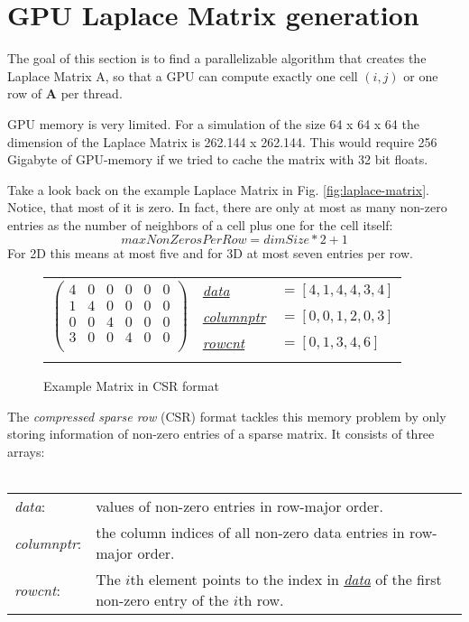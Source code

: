 \section{GPU Laplace Matrix generation}
The goal of this section is to find a parallelizable algorithm that creates the Laplace Matrix A, so that a GPU can compute exactly one cell $(i,j)$ or one row of \textbf{A} per thread.
\par GPU memory is very limited. For a simulation of the size 64 x 64 x 64 the dimension of the Laplace Matrix is 262.144 x 262.144. This would require 256 Gigabyte of GPU-memory if we tried to cache the matrix with 32 bit floats.  
\par Take a look back on the example Laplace Matrix in Fig. \ref{fig:laplace-matrix}. Notice, that most of it is zero. In fact, there are only at most as many non-zero entries as the number of neighbors of a cell plus one for the cell itself:
\begin{equation}
	maxNonZerosPerRow = dimSize * 2 + 1
\end{equation}
For 2D this means at most five and for 3D at most seven entries per row.
\newpage
\begin{figure*}
	\centering
	\begin{tabular}{lll}
	\multirow{3}{*}{$\left( {\begin{array}{cccccc}
   4 & 0 & 0 & 0 & 0 & 0  \\
   1 & 4 & 0 & 0 & 0 & 0  \\
   0 & 0 & 4 & 0 & 0 & 0  \\
   3 & 0 & 0 & 4 & 0 & 0  \\
  \end{array} } \right)$}
	& \hyperref[csr-data]{\textit{data}} & $=[4,1,4,4,3,4]$  \\
	& \hyperref[csr-columnptr]{\textit{columnptr}} & $=[0,0,1,2,0,3]$ \\
	& \hyperref[csr-rowcnt]{\textit{rowcnt}} & $=[0,1,3,4,6]$ \\
	& & 
	\end{tabular}
\caption{Example Matrix in CSR format}\label{fig:csr-matrix}
\end{figure*}
\par The \textit{compressed sparse row} (CSR) \parencite{tinney1967direct} format tackles this memory problem by only storing information of non-zero entries of a sparse matrix. It consists of three arrays:\\\\
\begin{tabular}{ll}
	\textit{data\label{csr-data}}: & values of non-zero entries in row-major order.\\
	\textit{columnptr\label{csr-columnptr}}: & the column indices of all non-zero data entries in row-major order.\\
	\textit{rowcnt\label{csr-rowcnt}}: & The $i$th element points to the index in \hyperref[csr-data]{\textit{data}} of the first non-zero entry of the $i$th row.
\end{tabular}\\\\
